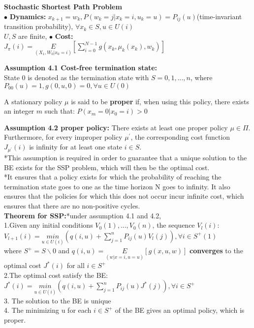 \documentclass[10pt,landscape]{article}
\begin{document}
\begin{multicols*}{4}
\textbf{Stochastic Shortest Path Problem}\\
$\bullet$ \textbf{Dynamics:} $x_{k+1}=w_k, P(w_k = j | x_k=i, u_k = u) = P_{ij}(u)$(time-invariant transition probability), $\forall x_k \in S, u \in U(i)$\\
$U, S$ are finite, $\bullet$ \textbf{Cost:}\\
$J_{\pi}(i) = \underset{(X_1, W_0| x_0 = i)}{E} [\sum_{i=0}^{N-1} g(x_k, \mu_k(x_k), w_k)]$

\textbf{Assumption 4.1 Cost-free termination state:}\\
State 0 is denoted as the termination state with $S = {0,1,...,n}$, where $P_{00}(u) = 1, g(0,u,0) = 0, \forall u \in U(0)$

A stationary policy $\mu$ is said to be \textbf{proper} if, when using this policy, there exists an integer $m$ such that:
$P(x_m = 0 | x_0=i) > 0$

\textbf{Assumption 4.2 proper policy:} There exists at least one proper policy $\mu \in \Pi$. Furthermore, for every improper policy $\mu ^{'}$, the corresponding cost function $J_{\mu ^{'}}(i)$ is infinity for at least one state $i \in S$.\\
*This assumption is required in order to guarantee that a unique solution to the
BE exists for the SSP problem, which will then be the optimal cost.\\
*It ensures that a policy exists for which the probability of reaching the
termination state goes to one as the time horizon N goes to infinity.
It also ensures that the policies for which this does not occur incur infinite
cost, which ensures that there are no non-positive cycles.
\\

\textbf{Theorem for SSP:}*under assumption 4.1 and 4.2,\\
1.Given any initial conditions $V_0(1),...,V_0(n)$, the sequence $V_l(i)$: $V_{l+1}(i) = \underset{u \in U(i)}{min} (q(i,u) + \sum_{j=1}^{n} P_{ij}(u)V_l(j)), \forall i \in S^{+}(1)$\\
where $S^{+} = S \backslash {0}$ and $q(i,u)=\underset{(w|x=i,u=u)}{E} [g(x,u,w)]$ \textbf{converges} to the optimal cost $J^{*}(i)$ for all $ i \in S^{+}$\\
2.The optimal cost satisfy the BE: 
$J^{*}(i) = \underset{u\in U(i)}{min} (q(i,u) + \sum_{j=1}^{n} P_{ij}(u) J^{*}(j)), \forall i \in S^{+}$\\
3. The solution to the BE is unique\\
4. The minimizing u for each $i \in S^{+}$ of the BE gives an optimal policy,
which is proper.



\end{multicols*}
\end{document}
